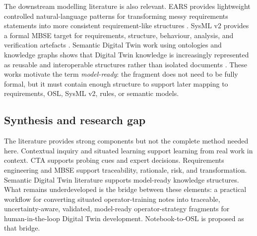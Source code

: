 The downstream modelling literature is also relevant. EARS provides lightweight controlled natural-language patterns for transforming messy requirements statements into more consistent requirement-like structures \cite{mavin2009ears}. SysML v2 provides a formal MBSE target for requirements, structure, behaviour, analysis, and verification artefacts \cite{omgSysml2024}. Semantic Digital Twin work using ontologies and knowledge graphs shows that Digital Twin knowledge is increasingly represented as reusable and interoperable structures rather than isolated documents \cite{karabulut2023ontologies,listl2024knowledge,braun2022graph}. These works motivate the term \emph{model-ready}: the fragment does not need to be fully formal, but it must contain enough structure to support later mapping to requirements, OSL, SysML v2, rules, or semantic models.

\subsection{Synthesis and research gap}

The literature provides strong components but not the complete method needed here. Contextual inquiry and situated learning support learning from real work in context. CTA supports probing cues and expert decisions. Requirements engineering and MBSE support traceability, rationale, risk, and transformation. Semantic Digital Twin literature supports model-ready knowledge structures. What remains underdeveloped is the bridge between these elements: a practical workflow for converting situated operator-training notes into traceable, uncertainty-aware, validated, model-ready operator-strategy fragments for human-in-the-loop Digital Twin development. Notebook-to-OSL is proposed as that bridge.
